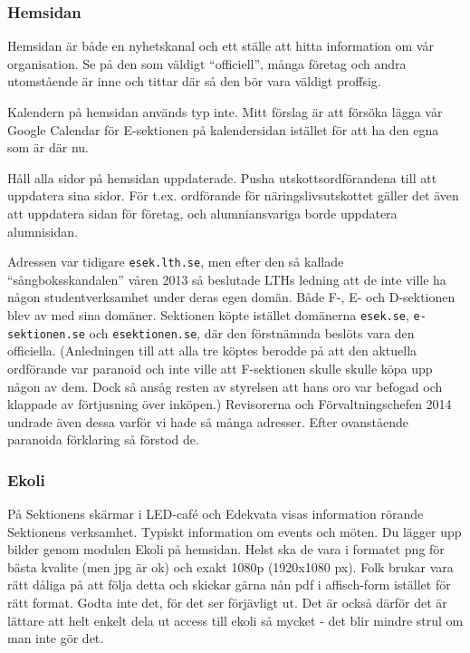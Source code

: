 \documentclass[10pt]{article}
\begin{document}
\subsubsection{Hemsidan}
Hemsidan är både en nyhetskanal och ett ställe att hitta information om vår organisation. Se på den som väldigt ``officiell'', många företag och andra utomstående är inne och tittar där så den bör vara väldigt proffsig.

Kalendern på hemsidan används typ inte. Mitt förslag är att försöka lägga vår Google Calendar för E-sektionen på kalendersidan istället för att ha den egna som är där nu.

Håll alla sidor på hemsidan uppdaterade. Pusha utskottsordförandena till att uppdatera sina sidor. För t.ex. ordförande för näringslivsutskottet gäller det även att uppdatera sidan för företag, och alumniansvariga borde uppdatera alumnisidan.

Adressen var tidigare \texttt{esek.lth.se}, men efter den så kallade ``sångboksskandalen'' våren 2013 så beslutade LTHs ledning att de inte ville ha någon studentverksamhet under deras egen domän. Både F-, E- och D-sektionen blev av med sina domäner. Sektionen köpte istället domänerna \texttt{esek.se}, \texttt{e-sektionen.se} och \texttt{esektionen.se}, där den förstnämnda beslöts vara den officiella. (Anledningen till att alla tre köptes berodde på att den aktuella ordförande var paranoid och inte ville att F-sektionen skulle skulle köpa upp någon av dem. Dock så ansåg resten av styrelsen att hans oro var befogad och klappade av förtjusning över inköpen.) Revisorerna och Förvaltningschefen 2014 undrade även dessa varför vi hade så många adresser. Efter ovanstående paranoida förklaring så förstod de.

\subsubsection{Ekoli}
På Sektionens skärmar i LED-café och Edekvata visas information rörande Sektionens verksamhet. Typiskt information om events och möten. Du lägger upp bilder genom modulen Ekoli på hemsidan. Helst ska de vara i formatet png för bästa kvalite (men jpg är ok) och exakt 1080p (1920x1080 px). Folk brukar vara rätt dåliga på att följa detta och skickar gärna nån pdf i affisch-form istället för rätt format. Godta inte det, för det ser förjävligt ut. Det är också därför det är lättare att helt enkelt dela ut access till ekoli så mycket - det blir mindre strul om man inte gör det.
\end{document}
